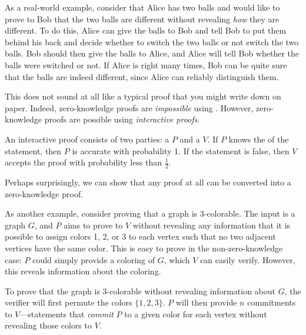 As a real-world example, consider that Alice has two balls and would like to prove to Bob that the two balls are different without revealing \emph{how} they are different. To do this, Alice can give the balls to Bob and tell Bob to put them behind his back and decide whether to switch the two balls or not switch the two balls. Bob should then give the balls to Alice, and Alice will tell Bob whether the balls were switched or not. If Alice is right many times, Bob can be quite sure that the balls are indeed different, since Alice can reliably distinguish them.

This does not sound at all like a typical proof that you might write down on paper. Indeed, zero-knowledge proofs are \emph{impossible} using . However, zero-knowledge proofs are possible using \emph{interactive proofs}.

\begin{definition}
An interactive proof consists of two parties: a  $P$ and a  $V$. If $P$ knows the  of the statement, then $P$ is accurate with probability 1. If the statement is false, then $V$ accepts the proof with probability less than $\tfrac{1}{2}$.
\end{definition}

Perhaps surprisingly, we can show that any proof at all can be converted into a zero-knowledge proof.

As another example, consider proving that a graph is 3-colorable. The input is a graph $G$, and $P$ aims to prove to $V$ without revealing any information that it is possible to assign colors 1, 2, or 3 to each vertex such that no two adjacent vertices have the same color. This is easy to prove in the non-zero-knowledge case: $P$ could simply provide a coloring of $G$, which $V$ can easily verify. However, this reveals information about the coloring.

To prove that the graph is 3-colorable without revealing information about $G$, the verifier will first permute the colors $\{1, 2, 3\}$. $P$ will then provide $n$ commitments to $V$---statements that \emph{commit} $P$ to a given color for each vertex without revealing those colors to $V$.

